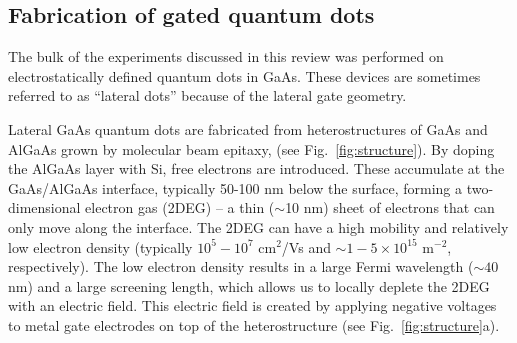 \documentclass[rmp,twocolumn,aps]{revtex4}
\begin{document}
\subsection{Fabrication of gated quantum dots}
\label{Sec:Fabrication}
The bulk of the experiments discussed in this review was performed
on electrostatically defined quantum dots in GaAs. These devices
are sometimes referred to as ``lateral dots'' because of the
lateral gate geometry.

Lateral GaAs quantum dots are fabricated from heterostructures of
GaAs and AlGaAs grown by molecular beam epitaxy, (see
Fig.~\ref{fig:structure}). By doping the AlGaAs layer with Si,
free electrons are introduced. These accumulate at the GaAs/AlGaAs
interface, typically 50-100 nm below the surface, forming a
two-dimensional electron gas (2DEG) -- a thin ($\sim$10 nm) sheet
of electrons that can only move along the interface. The 2DEG can
have a high mobility and relatively low electron density
(typically $10^5-10^7$ cm$^2$/Vs and $\sim 1-5\times 10^{15}$
m$^{-2}$, respectively). The low electron density results in a
large Fermi wavelength ($\sim 40$ nm) and a large screening
length, which allows us to locally deplete the 2DEG with an
electric field. This electric field is created by applying
negative voltages to metal gate electrodes on top of the
heterostructure (see Fig.~\ref{fig:structure}a).
\end{document}
